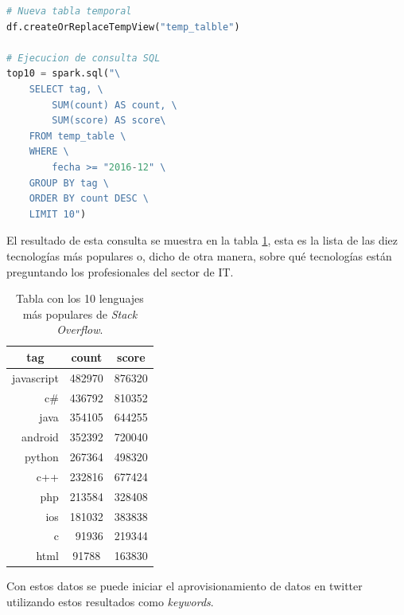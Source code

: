 \begin{lstlisting}[label=stof:anaTopSQL,language=Python,frame=single,caption=Código de generación de la tabla temporal y la ejecución de una consulta \gls{SQL}.]
# Nueva tabla temporal
df.createOrReplaceTempView("temp_talble")

# Ejecucion de consulta SQL
top10 = spark.sql("\
	SELECT tag, \
		SUM(count) AS count, \
		SUM(score) AS score\
	FROM temp_table \
	WHERE \
		fecha >= "2016-12" \
	GROUP BY tag \
	ORDER BY count DESC \
	LIMIT 10")
\end{lstlisting}

El resultado de esta consulta se muestra en la tabla \ref{stof:anaTop}, esta es la lista de las diez tecnologías más populares o, dicho de otra manera, sobre qué tecnologías están preguntando los profesionales del sector de \gls{IT}. 

\begin{table}[htp!]
	\centering
	\caption{Tabla con los 10 lenguajes más populares de \textit{Stack Overflow}.}
	\label{stof:anaTop}
	\begin{tabular}{|r|r|r|}
		\hline
		\multicolumn{1}{|c|}{\textbf{tag}} & \multicolumn{1}{c|}{\textbf{count}} & \multicolumn{1}{c|}{\textbf{score}} \\ \hline
		javascript                         & 482970                              & 876320                              \\
		c\#                                & 436792                              & 810352                              \\
		java                               & 354105                              & 644255                              \\
		android                            & 352392                              & 720040                              \\
		python                             & 267364                              & 498320                              \\
		c++                                & 232816                              & 677424                              \\
		php                                & 213584                              & 328408                              \\
		ios                                & 181032                              & 383838                              \\
		c                                  & 91936                               & 219344                              \\
		\multicolumn{1}{|r|}{html}         & \multicolumn{1}{c|}{91788}          & \multicolumn{1}{c|}{163830}         \\ \hline
	\end{tabular}
\end{table}

Con estos datos se puede iniciar el aprovisionamiento de datos en twitter utilizando estos resultados como \textit{keywords}.
